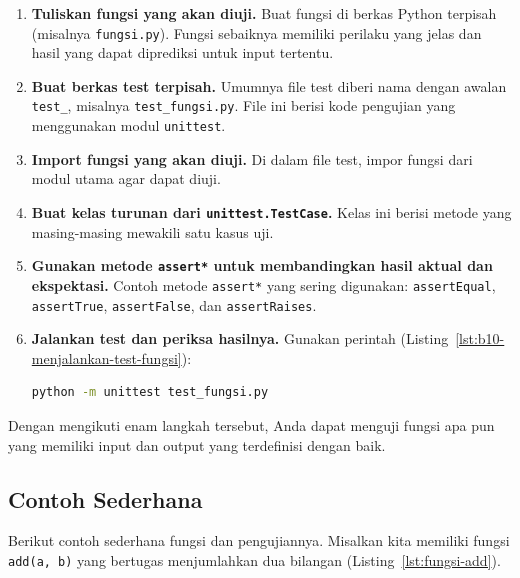 \begin{enumerate}
    \item \textbf{Tuliskan fungsi yang akan diuji.}  
    Buat fungsi di berkas Python terpisah (misalnya \texttt{fungsi.py}).  
    Fungsi sebaiknya memiliki perilaku yang jelas dan hasil yang dapat diprediksi untuk input tertentu.

    \item \textbf{Buat berkas test terpisah.}  
    Umumnya file test diberi nama dengan awalan \texttt{test\_}, misalnya \texttt{test\_fungsi.py}.  
    File ini berisi kode pengujian yang menggunakan modul \texttt{unittest}.

    \item \textbf{Import fungsi yang akan diuji.}  
    Di dalam file test, impor fungsi dari modul utama agar dapat diuji.

    \item \textbf{Buat kelas turunan dari \texttt{unittest.TestCase}.}  
    Kelas ini berisi metode yang masing-masing mewakili satu kasus uji.

    \item \textbf{Gunakan metode \texttt{assert*} untuk membandingkan hasil aktual dan ekspektasi.}  
    Contoh metode \texttt{assert*} yang sering digunakan:  
    \texttt{assertEqual}, \texttt{assertTrue}, \texttt{assertFalse}, dan \texttt{assertRaises}.

    \item \textbf{Jalankan test dan periksa hasilnya.}  
    Gunakan perintah (Listing~\ref{lst:b10-menjalankan-test-fungsi}):
\begin{lstlisting}[language=bash, caption={Menjalankan test fungsi}, label={lst:b10-menjalankan-test-fungsi}]
python -m unittest test_fungsi.py
\end{lstlisting}
\end{enumerate}

Dengan mengikuti enam langkah tersebut, Anda dapat menguji fungsi apa pun yang memiliki input dan output yang terdefinisi dengan baik.

\subsection{Contoh Sederhana}

Berikut contoh sederhana fungsi dan pengujiannya.  
Misalkan kita memiliki fungsi \texttt{add(a, b)} yang bertugas menjumlahkan dua bilangan (Listing~\ref{lst:fungsi-add}).


